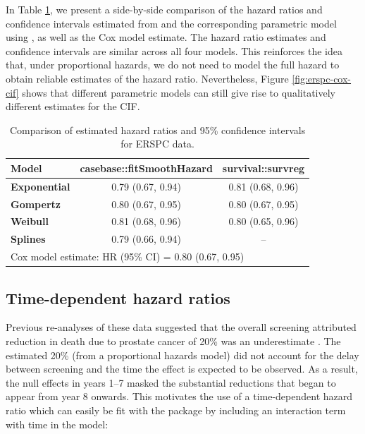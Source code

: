 In Table \ref{tab:print-erspc-estimates}, we present a side-by-side
comparison of the hazard ratios and confidence intervals estimated from
 and the corresponding parametric model using
, as well as the Cox model estimate. The hazard
ratio estimates and confidence intervals are similar across all four
models. This reinforces the idea that, under proportional hazards, we do
not need to model the full hazard to obtain reliable estimates of the
hazard ratio. Nevertheless, Figure \ref{fig:erspc-cox-cif} shows that
different parametric models can still give rise to qualitatively
different estimates for the CIF.

\begin{Schunk}
\begin{table}

\caption{\label{tab:print-erspc-estimates}Comparison of estimated hazard ratios and 95\% confidence intervals for ERSPC data.}
\centering
\begin{tabular}[t]{>{}lcc}
\toprule
Model & casebase::fitSmoothHazard & survival::survreg\\
\midrule
\textbf{Exponential} & 0.79 (0.67, 0.94) & 0.81 (0.68, 0.96)\\
\cmidrule{1-3}
\textbf{Gompertz} & 0.80 (0.67, 0.95) & 0.80 (0.67, 0.95)\\
\cmidrule{1-3}
\textbf{Weibull} & 0.81 (0.68, 0.96) & 0.80 (0.65, 0.96)\\
\cmidrule{1-3}
\textbf{Splines} & 0.79 (0.66, 0.94) & --\\
\bottomrule
\multicolumn{3}{l}{\rule{0pt}{1em}Cox model estimate: HR (95\% CI) = 0.80 (0.67, 0.95)}\\
\end{tabular}
\end{table}

\end{Schunk}

\hypertarget{time-dependent-hazard-ratios}{%
\subsection{Time-dependent hazard
ratios}\label{time-dependent-hazard-ratios}}

Previous re-analyses of these data suggested that the overall screening
attributed reduction in death due to prostate cancer of 20\% was an
underestimate \citep{hanley2010mortality}. The estimated 20\% (from a
proportional hazards model) did not account for the delay between
screening and the time the effect is expected to be observed. As a
result, the null effects in years 1--7 masked the substantial reductions
that began to appear from year 8 onwards. This motivates the use of a
time-dependent hazard ratio which can easily be fit with the
 package by including an interaction term with time in the
model:

